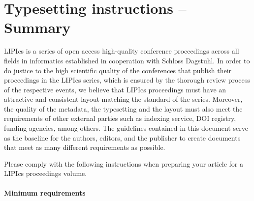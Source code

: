 \section{Typesetting instructions -- Summary}
\label{sec:typesetting-summary}

LIPIcs is a series of open access high-quality conference proceedings across all fields in informatics established in cooperation with Schloss Dagstuhl. 
In order to do justice to the high scientific quality of the conferences that publish their proceedings in the LIPIcs series, which is ensured by the thorough review process of the respective events, we believe that LIPIcs proceedings must have an attractive and consistent layout matching the standard of the series.
Moreover, the quality of the metadata, the typesetting and the layout must also meet the requirements of other external parties such as indexing service, DOI registry, funding agencies, among others. The guidelines contained in this document serve as the baseline for the authors, editors, and the publisher to create documents that meet as many different requirements as possible. 

Please comply with the following instructions when preparing your article for a LIPIcs proceedings volume. 
\paragraph*{Minimum requirements}

